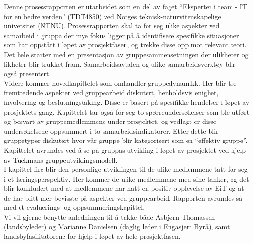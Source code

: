 

Denne prosessrapporten er utarbeidet som en del av faget “Eksperter i team - IT for en bedre verden” (TDT4850) ved Norges teknisk-naturvitenskapelige universitet (NTNU). Prosessrapporten skal ta for seg ulike aspekter ved samarbeid i gruppa der mye fokus ligger på å identifisere spesifikke situasjoner som har oppstått i løpet av prosjektfasen, og trekke disse opp mot relevant teori. Det hele starter med en presentasjon av gruppesammensetningen der ulikheter og likheter blir trukket fram. Samarbeidsavtalen og ulike samarbeidsverktøy blir også presentert.\\

Videre kommer hovedkapittelet som omhandler gruppedynamikk. Her blir tre fremtredende aspekter ved gruppearbeid diskutert, henholdsvis enighet, involvering og beslutningstaking. Disse er basert på spesifikke hendelser i løpet av prosjektets gang. Kapittelet tar også for seg to spørreundersøkelser som ble utført og besvart av gruppemedlemmene under prosjektet, og vedlagt er disse undersøkelsene oppsummert i to samarbeidsindikatorer. Etter dette blir gruppetyper diskutert hvor vår gruppe blir kategorisert som en “effektiv gruppe”. Kapittelet avrundes ved å se på gruppas utvikling i løpet av prosjektet ved hjelp av Tuckmans gruppeutviklingsmodell.\\

I kapittel fire blir den personlige utviklingen til de ulike medlemmene tatt for seg i et læringsperspektiv. Her kommer de ulike medlemmene med sine tanker, og det blir konkludert med at medlemmene har hatt en positiv opplevelse av EiT og at de har blitt mer bevisste på aspekter ved gruppearbeid. Rapporten avrundes så med et evaluerings- og oppsummeringskapittel.\\

Vi vil gjerne benytte anledningen til å takke både Asbjørn Thomassen (landsbyleder) og Marianne Danielsen (daglig leder i Engasjert Byrå), samt landsbyfasilitatorene for hjelp i løpet av hele prosjektfasen.
